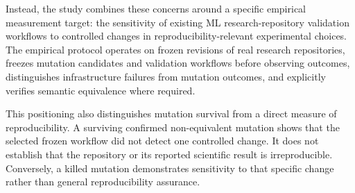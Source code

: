 Instead, the study combines these concerns around a specific empirical
measurement target: the sensitivity of existing ML research-repository
validation workflows to controlled changes in reproducibility-relevant
experimental choices. The empirical protocol operates on frozen revisions of
real research repositories, freezes mutation candidates and validation
workflows before observing outcomes, distinguishes infrastructure failures from
mutation outcomes, and explicitly verifies semantic equivalence where required.

This positioning also distinguishes mutation survival from a direct measure of
reproducibility. A surviving confirmed non-equivalent mutation shows that the
selected frozen workflow did not detect one controlled change. It does not
establish that the repository or its reported scientific result is
irreproducible. Conversely, a killed mutation demonstrates sensitivity to that
specific change rather than general reproducibility assurance.
